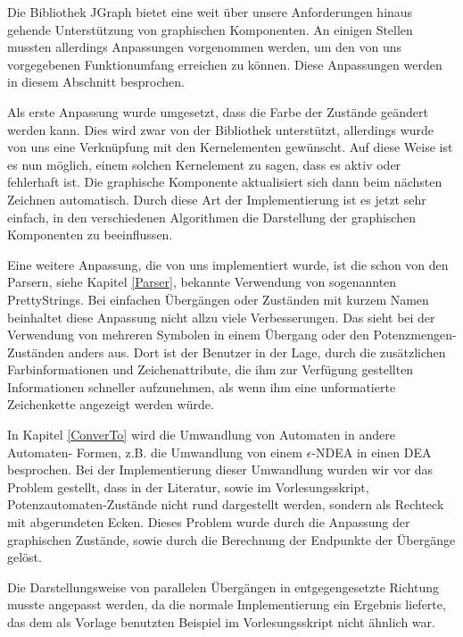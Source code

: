 Die Bibliothek JGraph bietet eine weit über unsere Anforderungen hinaus
gehende Unterstützung von graphischen Komponenten. An einigen Stellen mussten
allerdings Anpassungen vorgenommen werden, um den von uns vorgegebenen
Funktionumfang erreichen zu können. Diese Anpassungen werden in diesem
Abschnitt besprochen.\vspace{10pt}

Als erste Anpassung wurde umgesetzt, dass die Farbe der Zustände geändert
werden kann. Dies wird zwar von der Bibliothek unterstützt, allerdings wurde
von uns eine Verknüpfung mit den Kernelementen gewünscht. Auf diese Weise ist
es nun möglich, einem solchen Kernelement zu sagen, dass es aktiv oder
fehlerhaft ist. Die graphische Komponente aktualisiert sich dann beim nächsten
Zeichnen automatisch. Durch diese Art der Implementierung ist es jetzt sehr
einfach, in den verschiedenen Algorithmen die Darstellung der graphischen
Komponenten zu beeinflussen.\vspace{10pt}

Eine weitere Anpassung, die von uns implementiert wurde, ist die schon von den
Parsern, siehe Kapitel \ref{Parser}, bekannte Verwendung von sogenannten
PrettyStrings. Bei einfachen Übergängen oder Zuständen mit kurzem Namen
beinhaltet diese Anpassung nicht allzu viele Verbesserungen. Das sieht bei der
Verwendung von mehreren Symbolen in einem Übergang oder den
Potenzmengen-Zuständen anders aus. Dort ist der Benutzer in der Lage, durch die
zu\-sätz\-lich\-en Farbinformationen und Zeichenattribute, die ihm zur Verfügung
gestellten Informationen schneller aufzunehmen, als wenn ihm eine unformatierte
Zeichenkette angezeigt werden würde.\vspace{10pt}

In Kapitel \ref{ConverTo} wird die Umwandlung von Automaten in andere Automaten-
Formen, z.B. die Umwandlung von einem $\epsilon$-NDEA in einen DEA besprochen.
Bei der Implementierung dieser Umwandlung wurden wir vor das Problem gestellt,
dass in der Literatur, sowie im Vorlesungsskript, Potenzautomaten-Zustände nicht
rund dargestellt werden, sondern als Rechteck mit abgerundeten Ecken. Dieses
Problem wurde durch die Anpassung der graphischen Zustände, sowie durch die
Berechnung der Endpunkte der Übergänge gelöst.\vspace{10pt}

Die Darstellungsweise von parallelen Übergängen in entgegengesetzte Richtung
musste angepasst werden, da die normale Implementierung ein Ergebnis lieferte,
das dem als Vorlage benutzten Beispiel im Vorlesungsskript nicht ähnlich
war.\vspace{10pt}

